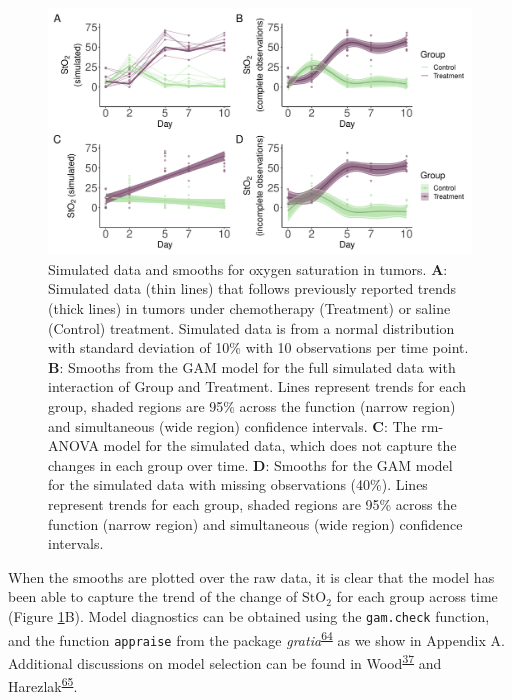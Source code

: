 \documentclass[
]{article}
\newcommand{\passthrough}[1]{#1}
\begin{document}
\begin{figure}

{\centering \includegraphics[width=1\linewidth]{Main_manuscript_files/figure-latex/sim-smooth-plot-1} 

}

\caption{Simulated data and smooths for oxygen saturation in tumors. \textbf{A}: Simulated data (thin lines) that follows previously reported trends (thick lines) in tumors under chemotherapy (Treatment) or saline (Control) treatment. Simulated data is from a normal distribution with standard deviation of 10\% with 10 observations per time point. \textbf{B}: Smooths from the GAM model for the full simulated data with interaction of Group and Treatment. Lines represent trends for each group, shaded regions are 95\% across the function (narrow region) and simultaneous (wide region) confidence intervals. \textbf{C}: The rm-ANOVA model for the simulated data, which does not capture the changes in each group over time. \textbf{D}: Smooths for the GAM model for the simulated data with missing observations (40\%). Lines represent trends for each group, shaded regions are 95\% across the function (narrow region) and simultaneous (wide region) confidence intervals.}\label{fig:sim-smooth-plot}
\end{figure}

When the smooths are plotted over the raw data, it is clear that the model has been able to capture the trend of the change of \(\mbox{StO}_2\) for each group across time (Figure \ref{fig:sim-smooth-plot}B). Model diagnostics can be obtained using the \passthrough{\lstinline!gam.check!} function, and the function \passthrough{\lstinline!appraise!} from the package \emph{gratia}\textsuperscript{\protect\hyperlink{ref-gratia}{64}} as we show in Appendix A. Additional discussions on model selection can be found in Wood\textsuperscript{\protect\hyperlink{ref-wood2017}{37}} and Harezlak\textsuperscript{\protect\hyperlink{ref-harezlak2018}{65}}.
\end{document}

